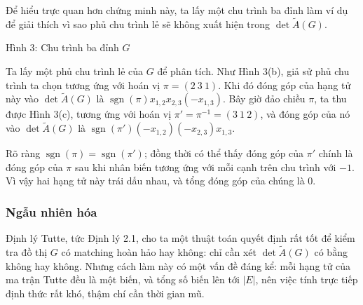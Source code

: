 \documentclass[11pt]{article}
\newcommand{\sgn}{\operatorname{sgn}}
\begin{document}
Để hiểu trực quan hơn chứng minh này, ta lấy một chu trình ba đỉnh làm ví dụ
để giải thích vì sao phủ chu trình lẻ sẽ không xuất hiện trong
\(\det\tilde A(G)\).

\begin{center}

\smallskip
Hình 3: Chu trình ba đỉnh \(G\)
\end{center}

Ta lấy một phủ chu trình lẻ của \(G\) để phân tích. Như Hình 3(b), giả sử phủ
chu trình ta chọn tương ứng với hoán vị \(\pi=(2\ 3\ 1)\). Khi đó đóng góp của
hạng tử này vào \(\det\tilde A(G)\) là
\(\sgn(\pi)x_{1,2}x_{2,3}(-x_{1,3})\). Bây giờ đảo chiều \(\pi\), ta thu được
Hình 3(c), tương ứng với hoán vị \(\pi'=\pi^{-1}=(3\ 1\ 2)\), và đóng góp của
nó vào \(\det\tilde A(G)\) là
\(\sgn(\pi')(-x_{1,2})(-x_{2,3})x_{1,3}\).

Rõ ràng \(\sgn(\pi)=\sgn(\pi')\); đồng thời có thể thấy đóng góp của
\(\pi'\) chính là đóng góp của \(\pi\) sau khi nhân biến tương ứng với mỗi
cạnh trên chu trình với \(-1\). Vì vậy hai hạng tử này trái dấu nhau, và tổng
đóng góp của chúng là \(0\).

\subsubsection{Ngẫu nhiên hóa}

Định lý Tutte, tức Định lý 2.1, cho ta một thuật toán quyết định rất tốt để
kiểm tra đồ thị \(G\) có matching hoàn hảo hay không: chỉ cần xét
\(\det\tilde A(G)\) có bằng không hay không. Nhưng cách làm này có một vấn đề
đáng kể: mỗi hạng tử của ma trận Tutte đều là một biến, và tổng số biến lên
tới \(|E|\), nên việc tính trực tiếp định thức rất khó, thậm chí cần thời gian
mũ.
\end{document}

